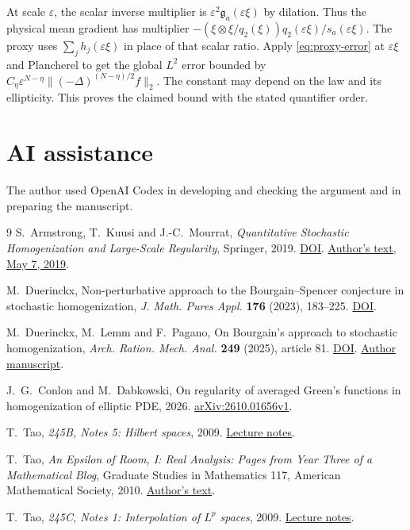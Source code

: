 \documentclass[11pt]{article}
\begin{document}
At scale \(\varepsilon\), the scalar inverse multiplier is \(\varepsilon^2\mathfrak g_a(\varepsilon\xi)\) by dilation. Thus the physical mean gradient has multiplier \(-(\xi\otimes\xi/q_2(\xi))q_2(\varepsilon\xi)/s_a(\varepsilon\xi)\). The proxy uses \(\sum_j h_j(\varepsilon\xi)\) in place of that scalar ratio. Apply \eqref{eq:proxy-error} at \(\varepsilon\xi\) and Plancherel to get the global \(L^2\) error bounded by \(C_\eta\varepsilon^{N-\eta}\|(-\Delta)^{(N-\eta)/2}f\|_2\). The constant may depend on the law and its ellipticity. This proves the claimed bound with the stated quantifier order.


\section*{AI assistance}
The author used OpenAI Codex in developing and checking the argument and in preparing the manuscript.

\begin{thebibliography}{9}
S.~Armstrong, T.~Kuusi and J.-C.~Mourrat,
\emph{Quantitative Stochastic Homogenization and Large-Scale Regularity},
Springer, 2019.
\href{https://doi.org/10.1007/978-3-030-15545-2}{DOI}.
\href{https://perso.ens-lyon.fr/jean-christophe.mourrat/AKMbook.pdf}{Author's text, May 7, 2019}.

M.~Duerinckx, Non-perturbative approach to the Bourgain--Spencer conjecture in stochastic homogenization,
\emph{J. Math. Pures Appl.} \textbf{176} (2023), 183--225.
\href{https://doi.org/10.1016/j.matpur.2023.06.005}{DOI}.

M.~Duerinckx, M.~Lemm and F.~Pagano, On Bourgain's approach to stochastic homogenization,
\emph{Arch. Ration. Mech. Anal.} \textbf{249} (2025), article 81.
\href{https://doi.org/10.1007/s00205-025-02145-5}{DOI}. \href{https://arxiv.org/abs/2406.09909}{Author manuscript}.

J.~G.~Conlon and M.~Dabkowski, On regularity of averaged Green's functions in homogenization of elliptic PDE, 2026.
\href{https://arxiv.org/abs/2610.01656v1}{arXiv:2610.01656v1}.

T.~Tao, \emph{245B, Notes 5: Hilbert spaces}, 2009.
\href{https://terrytao.wordpress.com/2009/01/17/254a-notes-5-hilbert-spaces/}{Lecture notes}.

T.~Tao, \emph{An Epsilon of Room, I: Real Analysis: Pages from Year Three of a Mathematical Blog}, Graduate Studies in Mathematics 117, American Mathematical Society, 2010.
\href{https://terrytao.wordpress.com/wp-content/uploads/2012/12/gsm-117-tao3-epsilon1.pdf}{Author's text}.

T.~Tao, \emph{245C, Notes 1: Interpolation of \(L^p\) spaces}, 2009.
\href{https://terrytao.wordpress.com/2009/03/30/245c-notes-1-interpolation-of-lp-spaces/}{Lecture notes}.
\end{thebibliography}
\end{document}
